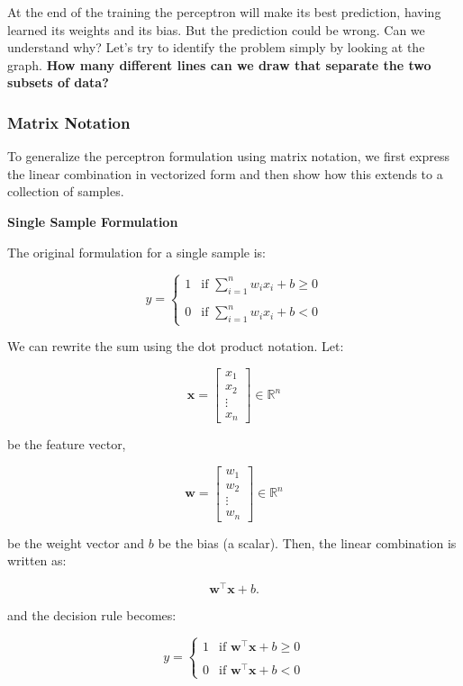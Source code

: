 \documentclass[11pt]{article}
\begin{document}
    At the end of the training the perceptron will make its best prediction,
having learned its weights and its bias. But the prediction could be
wrong. Can we understand why? Let's try to identify the problem simply
by looking at the graph. \textbf{How many different lines can we draw
that separate the two subsets of data?}

    \subsubsection{Matrix Notation}\label{matrix-notation}

To generalize the perceptron formulation using matrix notation, we first
express the linear combination in vectorized form and then show how this
extends to a collection of samples.

\textbf{Single Sample Formulation}

The original formulation for a single sample is:

$$
y = \begin{cases} 
1 & \text{if } \sum\limits_{i=1}^{n} w_i x_i + b \geq 0 \\
& \\
0 & \text{if } \sum\limits_{i=1}^{n} w_i x_i + b < 0
\end{cases}
$$

We can rewrite the sum using the dot product notation. Let:

$$\mathbf{x} = \begin{bmatrix} x_1 \\ x_2 \\ \vdots \\ x_n \end{bmatrix} \in \mathbb{R}^{n}$$

be the feature vector,

$$\mathbf{w} = \begin{bmatrix} w_1 \\ w_2 \\ \vdots \\ w_n \end{bmatrix} \in \mathbb{R}^{n}$$

be the weight vector and $b$ be the bias (a scalar). Then, the linear
combination is written as:

$$
\mathbf{w}^\top \mathbf{x} + b.
$$

and the decision rule becomes:

$$
y = \begin{cases} 
1 & \text{if } \mathbf{w}^\top \mathbf{x} + b \geq 0 \\
& \\
0 & \text{if } \mathbf{w}^\top \mathbf{x} + b < 0
\end{cases}
$$
\end{document}
